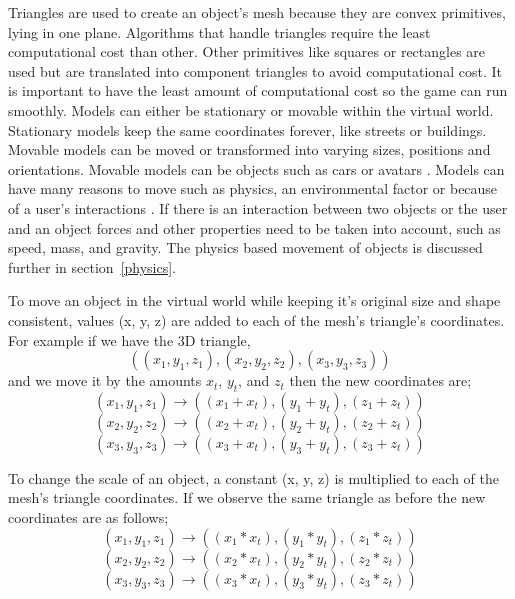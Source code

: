 Triangles are used to create an object's mesh because they are convex primitives, lying in one plane. Algorithms that  handle triangles require the least computational cost than other. Other primitives like squares or rectangles are used but are translated into component triangles to avoid computational cost. It is important to have the least amount of computational cost so the game can run smoothly. Models can either be stationary or movable within the virtual world. Stationary models keep the same coordinates forever, like streets or buildings. Movable models can be moved or transformed into varying sizes, positions and orientations. Movable models can be objects such as cars or avatars \cite{LaValle2017}. Models can have many reasons to move such as physics, an environmental factor or because of a user's interactions \cite{LaValle2017}. If there is an interaction between two objects or the user and an object forces and other properties need to be taken into account, such as speed, mass, and gravity. The physics based movement of objects is discussed further in section~\ref{physics}.   


To move an object in the virtual world while keeping it's original size and shape consistent, values (x, y, z) are added to each of the mesh's triangle's coordinates. For example if we have the 3D triangle,
\[((x_{1}, y_{1}, z_{1}), (x_{2}, y_{2}, z_{2}), (x_{3}, y_{3}, z_{3}))\]
and we move it by the amounts $x_{t}$, $y_{t}$, and $z_{t}$ then the new coordinates are;
\[(x_{1}, y_{1}, z_{1})  \rightarrow ((x_{1} + x_{t}), (y_{1} + y_{t}), (z_{1} + z_{t}))\] 
\[(x_{2}, y_{2}, z_{2})  \rightarrow ((x_{2} + x_{t}), (y_{2} + y_{t}), (z_{2} + z_{t}))\] 
\[(x_{3}, y_{3}, z_{3})  \rightarrow ((x_{3} + x_{t}), (y_{3} + y_{t}), (z_{3} + z_{t}))\]


To change the scale of an object, a constant (x, y, z) is multiplied to each of the mesh's triangle coordinates. If we observe the same triangle as before the new coordinates are as follows;
\[(x_{1}, y_{1}, z_{1})  \rightarrow ((x_{1} * x_{t}), (y_{1} * y_{t}), (z_{1} * z_{t}))\] 
\[(x_{2}, y_{2}, z_{2})  \rightarrow ((x_{2} * x_{t}), (y_{2} * y_{t}), (z_{2} * z_{t}))\] 
\[(x_{3}, y_{3}, z_{3})  \rightarrow ((x_{3} * x_{t}), (y_{3} * y_{t}), (z_{3} * z_{t}))\]


